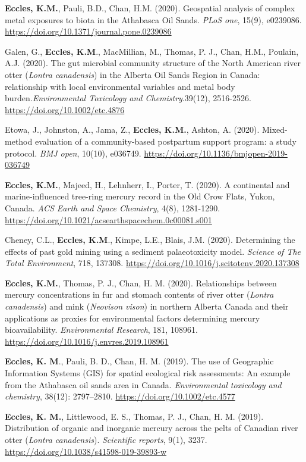 \documentclass[margin,line]{res}
\begin{document}
\begin{resume}
\textbf{Eccles, K.M.}, Pauli, B.D., Chan, H.M. (2020). Geospatial analysis of complex metal exposures to biota in the Athabasca Oil Sands. \textit{PLoS one}, 15(9), e0239086. \url{https://doi.org/10.1371/journal.pone.0239086}

Galen, G., \textbf{Eccles, K.M}., MacMillian, M., Thomas, P. J., Chan, H.M., Poulain, A.J. (2020). The gut microbial community structure of the North American river otter (\textit{Lontra canadensis}) in the Alberta Oil Sands Region in Canada: relationship with local environmental variables and metal body burden.\textit{Environmental Toxicology and Chemistry}.39(12), 2516-2526. \url{https://doi.org/10.1002/etc.4876}

Etowa, J., Johnston, A., Jama, Z., \textbf{Eccles, K.M.}, Ashton, A. (2020). Mixed-method evaluation of a community-based postpartum support program: a study protocol. \textit{BMJ open}, 10(10), e036749. \url{https://doi.org/10.1136/bmjopen-2019-036749}

\textbf{Eccles, K.M.}, Majeed, H., Lehnherr, I., Porter, T. (2020). A continental and marine-influenced tree-ring mercury record in the Old Crow Flats, Yukon, Canada. \textit{ACS Earth and Space Chemistry}, 4(8), 1281-1290. \url{https://doi.org/10.1021/acsearthspacechem.0c00081.s001}

Cheney, C.L., \textbf{Eccles, K.M}., Kimpe, L.E., Blais, J.M. (2020). Determining the effects of past gold mining using a sediment palaeotoxicity model. \textit{Science of The Total Environment}, 718, 137308. \url{https://doi.org/10.1016/j.scitotenv.2020.137308}

\textbf{Eccles, K.M.}, Thomas, P. J., Chan, H. M. (2020). Relationships between mercury concentrations in fur and stomach contents of river otter (\textit{Lontra canadensis}) and mink (\textit{Neovison vison}) in northern Alberta Canada and their applications as proxies for environmental factors determining mercury bioavailability. \textit{Environmental Research}, 181, 108961. \url{https://doi.org/10.1016/j.envres.2019.108961}

\textbf{Eccles, K. M}., Pauli, B. D., Chan, H. M. (2019). The use of Geographic Information Systems (GIS) for spatial ecological risk assessments: An example from the Athabasca oil sands area in Canada. \textit{Environmental toxicology and chemistry}, 38(12): 2797–2810. \url{https://doi.org/10.1002/etc.4577}

\textbf{Eccles, K. M.}, Littlewood, E. S., Thomas, P. J., Chan, H. M. (2019). Distribution of organic and inorganic mercury across the pelts of Canadian river otter (\textit{Lontra canadensis}). \textit{Scientific reports}, 9(1), 3237. \url{https://doi.org/10.1038/s41598-019-39893-w}


\end{resume}
\end{document}
